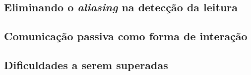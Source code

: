 \documentclass[12pt]{article}
\begin{document}
		\subsection{Eliminando o \textit{aliasing} na detecção da leitura}
		
		\subsection{Comunicação passiva como forma de interação}
		
		\subsection{Dificuldades a serem superadas}
		
		

 
\end{document}
